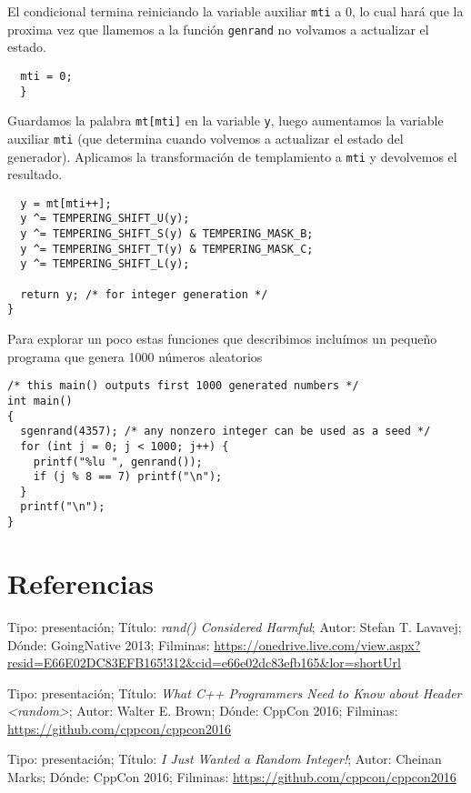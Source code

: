 \documentclass{article}
\begin{document}
El condicional termina reiniciando la variable auxiliar \verb#mti# a 0, lo cual hará que la proxima vez que llamemos a la función \verb#genrand# no volvamos a actualizar el estado.

\begin{verbatim}
  mti = 0;
  }    
\end{verbatim}

Guardamos la palabra \verb#mt[mti]# en la variable \verb#y#, luego aumentamos la variable auxiliar \verb#mti# (que determina cuando volvemos a actualizar el estado del generador).
Aplicamos la transformación de templamiento a \verb#mti# y devolvemos el resultado.

\begin{verbatim}
  y = mt[mti++];
  y ^= TEMPERING_SHIFT_U(y);
  y ^= TEMPERING_SHIFT_S(y) & TEMPERING_MASK_B;
  y ^= TEMPERING_SHIFT_T(y) & TEMPERING_MASK_C;
  y ^= TEMPERING_SHIFT_L(y);

  return y; /* for integer generation */
}
\end{verbatim}

Para explorar un poco estas funciones que describimos incluímos un pequeño programa que genera 1000 números aleatorios

\begin{verbatim}
/* this main() outputs first 1000 generated numbers */
int main()
{
  sgenrand(4357); /* any nonzero integer can be used as a seed */
  for (int j = 0; j < 1000; j++) {
    printf("%lu ", genrand());
    if (j % 8 == 7) printf("\n");
  }
  printf("\n");
}
\end{verbatim}

\section{Referencias}

Tipo: presentación;
Título: \emph{rand() Considered Harmful}; 
Autor: Stefan T. Lavavej; 
Dónde: GoingNative 2013;
Filminas: \url{https://onedrive.live.com/view.aspx?resid=E66E02DC83EFB165!312&cid=e66e02dc83efb165&lor=shortUrl}

Tipo: presentación;
Título: \emph{What C++ Programmers Need to Know about Header \textless random\textgreater};
Autor: Walter E. Brown;
Dónde: CppCon 2016;
Filminas: \url{https://github.com/cppcon/cppcon2016}

Tipo: presentación;
Título: \emph{I Just Wanted a Random Integer!};
Autor: Cheinan Marks;
Dónde: CppCon 2016;
Filminas: \url{https://github.com/cppcon/cppcon2016}
\end{document}
